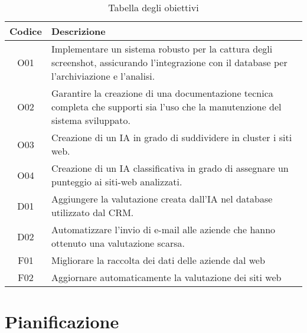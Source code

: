 \begin{table}[h!]
    \centering
    \begin{tabularx}{0.8\textwidth}{|c|X|}
    \hline
    \textbf{Codice} & \textbf{Descrizione} \\
    \hline
    O01 & Implementare un sistema robusto per la cattura degli screenshot, assicurando l’integrazione con il
        database per l’archiviazione e l’analisi. \\
    \hline
    O02 & Garantire la creazione di una documentazione tecnica completa che supporti sia l’uso che la manutenzione  del sistema sviluppato. \\
    \hline
    O03 & Creazione di un IA in grado di suddividere in cluster i siti web. \\
    \hline
    O04 & Creazione di un IA classificativa in grado di assegnare un punteggio ai siti-web analizzati.\\
    \hline
    D01 & Aggiungere la valutazione creata dall'IA nel database utilizzato dal CRM.\\
    \hline
    D02 & Automatizzare l'invio di e-mail alle aziende che hanno ottenuto una valutazione scarsa.\\
    \hline
    F01 & Migliorare la raccolta dei dati delle aziende dal web\\
    \hline
    F02 & Aggiornare automaticamente la valutazione dei siti web\\
    \hline
    \end{tabularx}
    \caption{Tabella degli obiettivi}
    \end{table}

\section{Pianificazione}
